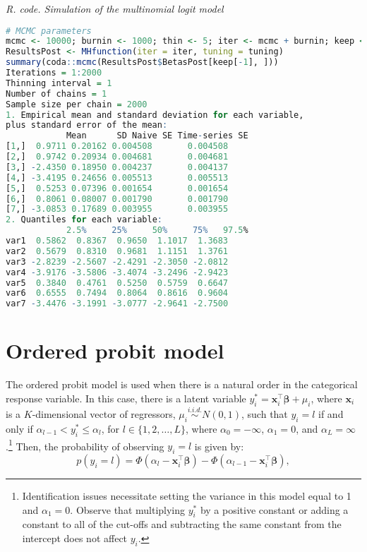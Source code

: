 \begin{tcolorbox}[enhanced,width=4.67in,center upper,
	fontupper=\large\bfseries,drop shadow southwest,sharp corners]
	\textit{R. code. Simulation of the multinomial logit model}
	\begin{VF}
		\begin{lstlisting}[language=R]		
# MCMC parameters
mcmc <- 10000; burnin <- 1000; thin <- 5; iter <- mcmc + burnin; keep <- seq(burnin, iter, thin); tuning <- 6 # Degrees of freedom
ResultsPost <- MHfunction(iter = iter, tuning = tuning)
summary(coda::mcmc(ResultsPost$BetasPost[keep[-1], ]))
Iterations = 1:2000
Thinning interval = 1 
Number of chains = 1 
Sample size per chain = 2000 
1. Empirical mean and standard deviation for each variable,
plus standard error of the mean:
			Mean      SD Naive SE Time-series SE
[1,]  0.9711 0.20162 0.004508       0.004508
[2,]  0.9742 0.20934 0.004681       0.004681
[3,] -2.4350 0.18950 0.004237       0.004137
[4,] -3.4195 0.24656 0.005513       0.005513
[5,]  0.5253 0.07396 0.001654       0.001654
[6,]  0.8061 0.08007 0.001790       0.001790
[7,] -3.0853 0.17689 0.003955       0.003955
2. Quantiles for each variable:
			2.5%     25%     50%     75%   97.5%
var1  0.5862  0.8367  0.9650  1.1017  1.3683
var2  0.5679  0.8310  0.9681  1.1151  1.3761
var3 -2.8239 -2.5607 -2.4291 -2.3050 -2.0812
var4 -3.9176 -3.5806 -3.4074 -3.2496 -2.9423
var5  0.3840  0.4761  0.5250  0.5759  0.6647
var6  0.6555  0.7494  0.8064  0.8616  0.9604
var7 -3.4476 -3.1991 -3.0777 -2.9641 -2.7500
\end{lstlisting}
	\end{VF}
\end{tcolorbox} 

\section{Ordered probit model}\label{sec66}

The ordered probit model is used when there is a natural order in the categorical response variable. In this case, there is a latent variable $y_i^* = \bm{x}_i^{\top}\bm{\beta} + \mu_i$, where $\bm x_i$ is a $K$-dimensional vector of regressors, $\mu_i \stackrel{i.i.d.}{\sim} N(0,1)$, such that $y_i = l$ if and only if $\alpha_{l-1} < y_i^* \leq \alpha_l$, for $l \in \{1, 2, \dots, L\}$, where $\alpha_0 = -\infty$, $\alpha_1 = 0$, and $\alpha_L = \infty$.\footnote{Identification issues necessitate setting the variance in this model equal to 1 and $\alpha_1 = 0$. Observe that multiplying $y_i^*$ by a positive constant or adding a constant to all of the cut-offs and subtracting the same constant from the intercept does not affect $y_i$.} Then, the probability of observing $y_i = l$ is given by:
\[
p(y_i = l) = \Phi(\alpha_l - \bm{x}_i^{\top}\bm{\beta}) - \Phi(\alpha_{l-1} - \bm{x}_i^{\top}\bm{\beta}),
\]

